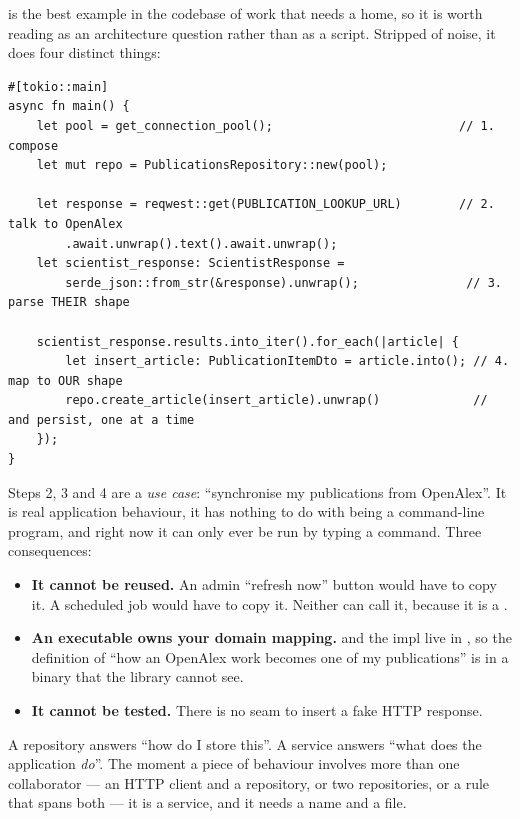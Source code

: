  is the best example in the codebase of work that needs a home,
so it is worth reading as an architecture question rather than as a script. Stripped of noise, it
does four distinct things:

\begin{lstlisting}[style=rs,caption={\file{src/bin/seed\_publications.rs}, as written --- four
responsibilities in one \code{main}.}]
#[tokio::main]
async fn main() {
    let pool = get_connection_pool();                          // 1. compose
    let mut repo = PublicationsRepository::new(pool);

    let response = reqwest::get(PUBLICATION_LOOKUP_URL)        // 2. talk to OpenAlex
        .await.unwrap().text().await.unwrap();
    let scientist_response: ScientistResponse =
        serde_json::from_str(&response).unwrap();               // 3. parse THEIR shape

    scientist_response.results.into_iter().for_each(|article| {
        let insert_article: PublicationItemDto = article.into(); // 4. map to OUR shape
        repo.create_article(insert_article).unwrap()             //    and persist, one at a time
    });
}
\end{lstlisting}

Steps 2, 3 and 4 are a \emph{use case}: ``synchronise my publications from OpenAlex''. It is real
application behaviour, it has nothing to do with being a command-line program, and right now it can
only ever be run by typing a command. Three consequences:

\begin{itemize}
  \item \textbf{It cannot be reused.} An admin ``refresh now'' button would have to copy it. A
    scheduled job would have to copy it. Neither can call it, because it is a .
  \item \textbf{An executable owns your domain mapping.}  and the
     impl live in , so the definition of ``how an
    OpenAlex work becomes one of my publications'' is in a binary that the library cannot see.
  \item \textbf{It cannot be tested.} There is no seam to insert a fake HTTP response.
\end{itemize}

\begin{keyidea}
A repository answers ``how do I store this''. A service answers ``what does the application
\emph{do}''. The moment a piece of behaviour involves more than one collaborator --- an HTTP client
and a repository, or two repositories, or a rule that spans both --- it is a service, and it needs a
name and a file.
\end{keyidea}

